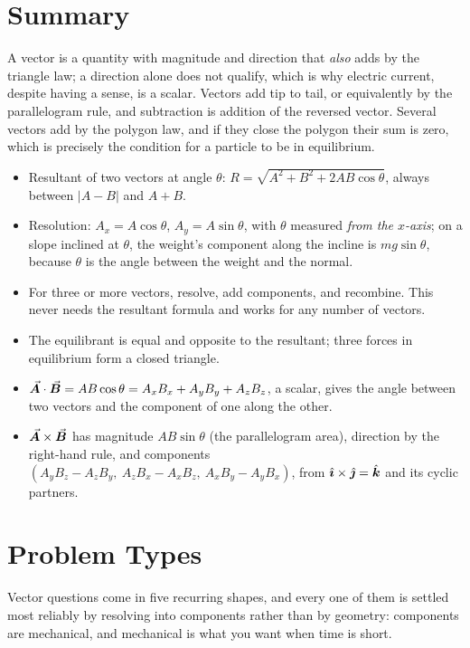 \section{Summary}\label{sec:summary3}
A vector is a quantity with magnitude and direction that \emph{also} adds by the triangle law; a
direction alone does not qualify, which is why electric current, despite having a sense, is a scalar.
Vectors add tip to tail, or equivalently by the parallelogram rule, and subtraction is addition of the
reversed vector. Several vectors add by the polygon law, and if they close the polygon their sum is zero,
which is precisely the condition for a particle to be in equilibrium.

\begin{itemize}
\item Resultant of two vectors at angle $\theta$: $R=\sqrt{A^2+B^2+2AB\cos\theta}$, always between
      $|A-B|$ and $A+B$.
\item Resolution: $A_x=A\cos\theta$, $A_y=A\sin\theta$, with $\theta$ measured \emph{from the $x$-axis};
      on a slope inclined at $\theta$, the weight's component along the incline is $mg\sin\theta$, because
      $\theta$ is the angle between the weight and the normal.
\item For three or more vectors, resolve, add components, and recombine. This never needs the resultant
      formula and works for any number of vectors.
\item The equilibrant is equal and opposite to the resultant; three forces in equilibrium form a closed
      triangle.
\item $\vec{\bm{A}}\cdot\vec{\bm{B}}=AB\cos\theta=A_xB_x+A_yB_y+A_zB_z$, a scalar, gives the angle between two
      vectors and the component of one along the other.
\item $\vec{\bm{A}}\times\vec{\bm{B}}$ has magnitude $AB\sin\theta$ (the parallelogram area), direction by the
      right-hand rule, and components $(A_yB_z-A_zB_y,\ A_zB_x-A_xB_z,\ A_xB_y-A_yB_x)$, from
      $\hat{\bm{\imath}}\times\hat{\bm{\jmath}}=\hat{\bm{k}}$ and its cyclic partners.
\end{itemize}

\section{Problem Types}\label{sec:types3}
Vector questions come in five recurring shapes, and every one of them is settled most reliably by
resolving into components rather than by geometry: components are mechanical, and mechanical is what
you want when time is short.

